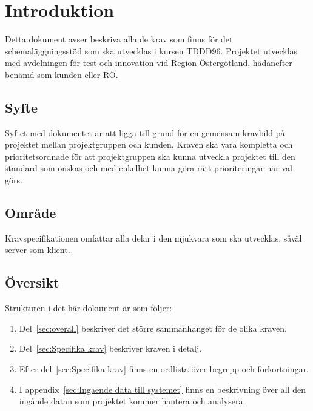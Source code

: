 \documentclass{article}
\begin{document}
\def\ftitle{Kravspecifikation}
\def\fversion{1.0}




\section{Introduktion}
Detta dokument avser beskriva alla de krav som finns för det schemaläggningsstöd
som ska utvecklas i kursen TDDD96. Projektet utvecklas med avdelningen för test
och innovation vid Region Östergötland, hädanefter benämd som kunden eller RÖ.

\subsection{Syfte}
Syftet med dokumentet är att ligga till grund för en gemensam kravbild på
projektet mellan projektgruppen och kunden. Kraven ska vara kompletta och
prioritetsordnade för att projektgruppen ska kunna utveckla projektet till den
standard som önskas och med enkelhet kunna göra rätt prioriteringar när val görs.

\subsection{Område}
Kravspecifikationen omfattar alla delar i den mjukvara som ska utvecklas, såväl
server som klient.

\subsection{Översikt}
Strukturen i det här dokument är som följer:

\begin{enumerate}
\item Del~\ref{sec:overall} beskriver det större sammanhanget för de olika
kraven.
\item Del~\ref{sec:Specifika krav} beskriver kraven i detalj.
\item Efter del~\ref{sec:Specifika krav} finns en ordlista över begrepp och
förkortningar.
\item I appendix~\ref{sec:Ingaende data till systemet} finns en beskrivning
över all den ingånde datan som projektet kommer hantera och analysera.

\end{enumerate}

\end{document}
